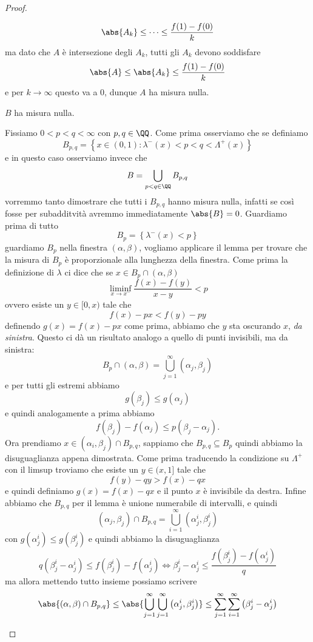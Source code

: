 \documentclass[11pt]{scrartcl}
\begin{document}
\begin{proof}
\begin{subproof}
	 		$$\abs{A_k}\le \dots \le \frac{f(1)-f(0)}{k}$$
	 		ma dato che $A$ è intersezione degli $A_k$, tutti gli $A_k$ devono soddisfare
	 		$$\abs{A}\le \abs{A_k}\le \frac{f(1)-f(0)}{k}$$
	 		e per $k\to\infty$ questo va a $0$, dunque $A$ ha misura nulla.
	 	\end{subproof}
	 	\begin{claim}
	 		$B$ ha misura nulla.
	 	\end{claim}
	 	\begin{subproof}
	 		Fissiamo $0<p<q<\infty$ con $p,q\in\QQ$. Come prima osserviamo che se definiamo
	 		$$B_{p,q}=\left\{x\in(0,1):\lambda^-(x)<p<q<\Lambda^+(x)\right\}$$
	 		e in questo caso osserviamo invece che
	 		$$B=\bigcup_{p<q\in\QQ}B_{p,q}$$
	 		vorremmo tanto dimostrare che tutti i $B_{p,q}$ hanno misura nulla, infatti se così fosse per subadditvità avremmo immediatamente $\abs{B}=0$. Guardiamo prima di tutto 
	 		$$B_p=\left\{\lambda^-(x)<p\right\}$$
	 		guardiamo $B_p$ nella finestra $(\alpha,\beta)$, vogliamo applicare il lemma per trovare che la misura di $B_p$ è proporzionale alla lunghezza della finestra. Come prima la definizione di $\lambda$ ci dice che se $x\in B_p\cap (\alpha,\beta)$ 
	 		$$\liminf_{x\to x^-}\frac{f(x)-f(y)}{x-y}<p$$
	 		ovvero esiste un $y\in [0,x)$ tale che
	 		$$f(x)-px<f(y)-py$$
	 		definendo $g(x)=f(x)-px$ come prima, abbiamo che $y$ sta oscurando $x$, \textit{da sinistra}. Questo ci dà un risultato analogo a quello di punti invisibili, ma da sinistra:
	 		$$B_p\cap (\alpha,\beta)=\bigcup_{j=1}^\infty (\alpha_j,\beta_j)$$
	 		e per tutti gli estremi abbiamo
	 		$$g(\beta_j)\le g(\alpha_j)$$
	 		e quindi analogamente a prima abbiamo
	 		$$f(\beta_j)-f(\alpha_j)\le p(\beta_j-\alpha_j).$$
	 		Ora prendiamo $x\in(\alpha_i,\beta_j)\cap B_{p,q}$, sappiamo che $B_{p,q}\subseteq B_p$ quindi abbiamo la disuguaglianza appena dimostrata. Come prima traducendo la condizione su $\Lambda^+$ con il limsup troviamo che esiste un $y\in (x,1]$ tale che
	 		$$f(y)-qy>f(x)-qx$$
	 		e quindi definiamo $g(x)=f(x)-qx$ e il punto $x$ è invisibile da destra. Infine abbiamo che $B_{p,q}$ per il lemma è unione numerabile di intervalli, e quindi
	 		$$(\alpha_j,\beta_j)\cap B_{p,q}=\bigcup_{i=1}^\infty (\alpha_j^i,\beta_j^i)$$
	 		con $g(\alpha_j^i)\le g(\beta_j^i)$ e quindi abbiamo la disuguaglianza
	 		$$q\left(\beta_j^i-\alpha_j^i\right)\le f\left(\beta_j^i\right)-f\left(\alpha_j^i\right) \iff\beta_j^i-\alpha_j^i
	 		 \le \frac{f\left(\beta_j^i\right)-f\left(\alpha_j^i\right)}{q}$$
	 		ma allora mettendo tutto insieme possiamo scrivere
	 		$$\abs{(\alpha,\beta)\cap B_{p,q}}\le \abs{\bigcup_{j=1}^\infty \bigcup_{j=1}^\infty \left(\alpha_j^i,\beta_j^i\right)}\le \sum_{j=1}^{\infty}\sum_{i=1}^{\infty}\left(\beta_j^i-\alpha_j^i\right)$$

\end{subproof}
\end{proof}
\end{document}

